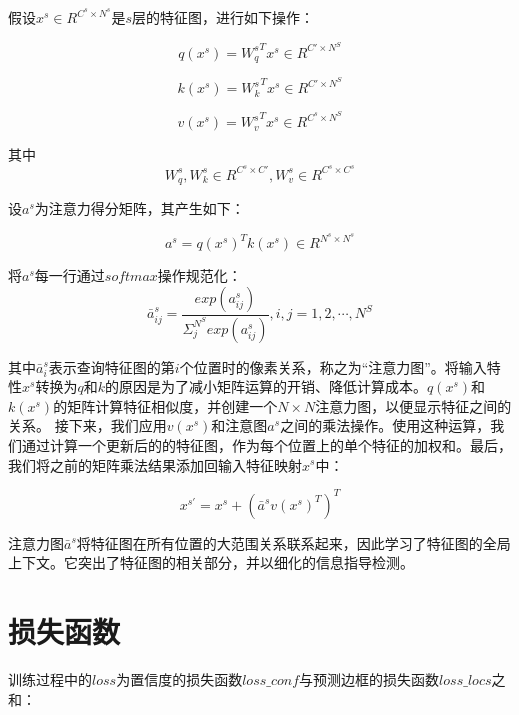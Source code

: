 假设$x^s\in R^{C^s\times N^s}$是$s$层的特征图，进行如下操作：

\begin{equation}
	q(x^s)={W_q^{s}}^Tx^s\in R^{C'\times N^S}
\end{equation}

\begin{equation}
	k(x^s)={W_k^{s}}^Tx^s\in R^{C'\times N^S}
\end{equation}

\begin{equation}
	v(x^s)={W_v^{s}}^Tx^s\in R^{C^s\times N^S}
\end{equation}


其中
\begin{equation}
	W_q^{s},W_k^{s}\in R^{C^s\times C'} , 
	W_v^{s}\in R^{C^s\times C^s}
\end{equation}

设$a^s$为注意力得分矩阵，其产生如下：

\begin{equation}
	a^s={q(x^s)}^Tk(x^s)\in R^{N^s\times N^s}
\end{equation}


将$a^s$每一行通过$softmax$操作规范化：
\begin{equation}
	\bar a^s_{ij}=\frac{exp(a^s_{ij})}{\Sigma^{N^S}_jexp(a^s_{ij})},i,j=1,2,\cdots,N^S
\end{equation}


其中$\bar a^s_{i}$表示查询特征图的第$i$个位置时的像素关系，称之为“注意力图”。将输入特性$x^s$转换为$q$和$k$的原因是为了减小矩阵运算的开销、降低计算成本。$q(x^s)$和$k(x^s)$的矩阵计算特征相似度，并创建一个$N\times N$注意力图，以便显示特征之间的关系。
接下来，我们应用$v(x^s)$和注意图$a^s$之间的乘法操作。使用这种运算，我们通过计算一个更新后的的特征图，作为每个位置上的单个特征的加权和。最后，我们将之前的矩阵乘法结果添加回输入特征映射$x^s$中：

\begin{equation}
	x^{s'}=x^s+{(\bar a^s v(x^s)^T)}^T
\end{equation}

注意力图$\bar a^s$将特征图在所有位置的大范围关系联系起来，因此学习了特征图的全局上下文。它突出了特征图的相关部分，并以细化的信息指导检测。

\section{损失函数}
训练过程中的$loss$为置信度的损失函数$loss\_conf$与预测边框的损失函数$loss\_locs$之和：

